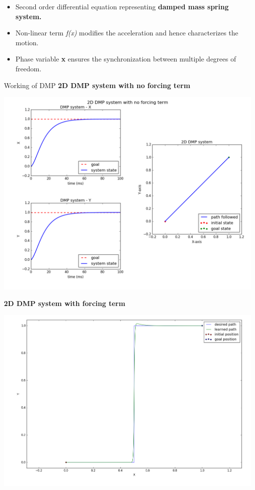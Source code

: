 \documentclass{beamer}
\begin{document}
	
	\begin{frame}
		\begin{itemize}
			\item Second order differential equation representing \textbf{damped mass spring system.} 
			\item Non-linear term \textit{f(x)} modifies the acceleration and hence characterizes the motion. 
			\item Phase variable \textbf{x} ensures the synchronization between multiple degrees of freedom.  
		\end{itemize}
	\end{frame}

	\begin{frame}{Working of DMP}
		\centering
		\textbf{2D DMP system with no forcing term}
		
		\includegraphics[scale=0.3]{images/dmp_no_f}
	\end{frame}
	
	\begin{frame}
		\centering
		\textbf{2D DMP system with forcing term}

		\includegraphics[width=\textwidth]{images/step_f}
	\end{frame}
	
\end{document}
